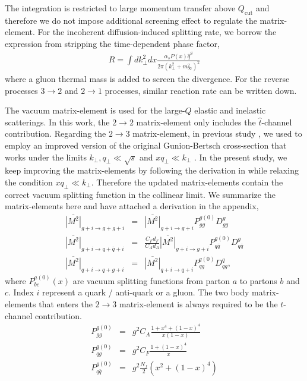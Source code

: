 The integration is restricted to large momentum transfer above $Q_{\textrm{cut}}$ and therefore we do not impose additional screening effect to regulate the matrix-element.
For the incoherent diffusion-induced splitting rate, we borrow the expression from \cite{Cao:2017hhk} stripping the time-dependent phase factor,
\begin{eqnarray}
R = \int d k_\perp^2 dx \frac{\alpha_s P(x) \hat{q}^S}{2\pi (k_\perp^2 + m_\infty^2)^2}
\end{eqnarray}
where a gluon thermal mass is added to screen the divergence.
For the reverse processes $3\rightarrow 2$  and $2\rightarrow 1$ processes, similar reaction rate can be written down.

The vacuum matrix-element is used for the large-$Q$ elastic and inelastic scatterings.
In this work, the $2\rightarrow 2$ matrix-element only includes the $\hat{t}$-channel contribution.
Regarding the $2\rightarrow 3$ matrix-element, in previous study \cite{Ke:2018tsh}, we used to employ an improved version of the original Gunion-Bertsch cross-section that works under the limits $k_\perp, q_\perp \ll \sqrt{s}$ and $x q_\perp \ll k_\perp$ \cite{PhysRevD.25.746,Fochler:2013epa,Uphoff:2014hza}.
In the present study, we keep improving the matrix-elements by following the derivation in \cite{Fochler:2013epa} while relaxing the condition $x q_\perp \ll k_\perp$.
Therefore the updated matrix-elements contain the correct vacuum splitting function in the collinear limit.
We summarize the matrix-elements here and have attached a derivation in the appendix,
\begin{eqnarray}
\overline{|M^2|}_{g+i\rightarrow g+g+i} &=& \overline{|M^2|}_{g+i\rightarrow g+i} P_{gg}^{g(0)}  D_{gg}^{g}\\
\overline{|M^2|}_{g+i\rightarrow q+\bar{q}+i} &=& \frac{C_F d_F}{C_A d_A}\overline{|M^2|}_{g+i\rightarrow g+i} P_{q\bar{q}}^{g(0)} D_{q\bar{q}}^{g}\\
\overline{|M^2|}_{q+i\rightarrow q+g+i} &=& \overline{|M^2|}_{q+i\rightarrow q+i} P_{qg}^{q(0)} D_{qg}^{q},
\end{eqnarray}
where $P_{bc}^{a(0)}(x)$ are vacuum splitting functions from parton $a$ to partons $b$ and $c$. Index $i$ represent a quark / anti-quark or a gluon.
The two body matrix-elements that enters the $2\rightarrow 3$ matrix-element is always required to be the $t$-channel contribution.
\begin{eqnarray}
P_{gg}^{g(0)}  &=& g^2  C_A\frac{1+x^4+(1-x)^4}{x(1-x)}\\
P_{qg}^{q(0)} &=& g^2  C_F\frac{1+(1-x)^4}{x}\\
P_{q\bar{q}}^{g(0)} &=& g^2  \frac{N_f}{2}\left(x^2+(1-x)^4\right)
\end{eqnarray}
